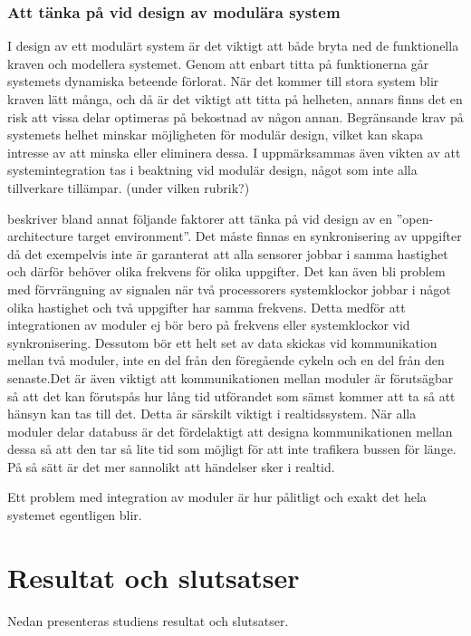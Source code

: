 \documentclass[11pt]{article}
\begin{document}
\begin{flushleft}
\subsubsection{Att tänka på vid design av modulära system}


I design av ett modulärt system är det viktigt att både bryta ned de funktionella kraven och modellera systemet. Genom att enbart titta på funktionerna går systemets dynamiska beteende förlorat. När det kommer till stora system blir kraven lätt många, och då är det viktigt att titta på helheten, annars finns det en risk att vissa delar optimeras på bekostnad av någon annan. Begränsande krav på systemets helhet minskar möjligheten för modulär design, vilket kan skapa intresse av att minska eller eliminera dessa. \cite{Modules} I \cite{MMPD} uppmärksammas även vikten av att systemintegration tas i beaktning vid modulär design, något som inte alla tillverkare tillämpar. (under vilken rubrik?)

\cite{IRS} beskriver bland annat följande faktorer att tänka på vid design av en ''open-architecture target environment''.  Det  måste finnas en synkronisering av uppgifter då det exempelvis inte är garanterat att alla sensorer jobbar i samma hastighet och därför behöver olika frekvens för olika uppgifter. Det kan även bli problem med förvrängning av signalen när två processorers systemklockor jobbar i något olika hastighet och två uppgifter har samma frekvens. Detta medför att integrationen av moduler ej bör bero på frekvens eller systemklockor vid synkronisering. Dessutom bör ett helt set av data skickas vid kommunikation mellan två moduler, inte en del från den föregående cykeln och en del från den senaste.Det är även viktigt att kommunikationen mellan moduler är förutsägbar så att det kan förutspås hur lång tid utförandet som sämst kommer att ta så att hänsyn kan tas till det. Detta är särskilt viktigt i realtidssystem. När alla moduler delar databuss är det fördelaktigt att designa kommunikationen mellan dessa så att den tar så lite tid som möjligt för att inte trafikera bussen för länge. På så sätt är det mer sannolikt att händelser sker i realtid.  


Ett problem med integration av moduler är hur pålitligt och exakt det hela systemet egentligen blir. \cite{DIMRS}

\pagebreak

\section{Resultat och slutsatser}
Nedan presenteras studiens resultat och slutsatser.


\end{flushleft}
\end{document}
